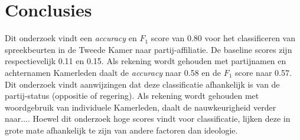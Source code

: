 \section{Conclusies}
\label{sec:conc}

Dit onderzoek vindt een \textit{accuracy} en $F_1$ score van 0.80 voor het classificeren van spreekbeurten in de Tweede Kamer naar partij-affiliatie. De baseline scores zijn respectievelijk 0.11 en 0.15. Als rekening wordt gehouden met partijnamen en achternamen Kamerleden daalt de \textit{accuracy} naar 0.58 en de $F_1$ score naar 0.57. Dit onderzoek vindt aanwijzingen dat deze classificatie afhankelijk is van de partij-status (oppositie of regering). Als rekening wordt gehouden met woordgebruik van individuele Kamerleden, daalt de nauwkeurigheid verder naar.... Hoewel dit onderzoek hoge scores vindt voor classificatie, lijken deze in grote mate afhankelijk te zijn van andere factoren dan ideologie.
